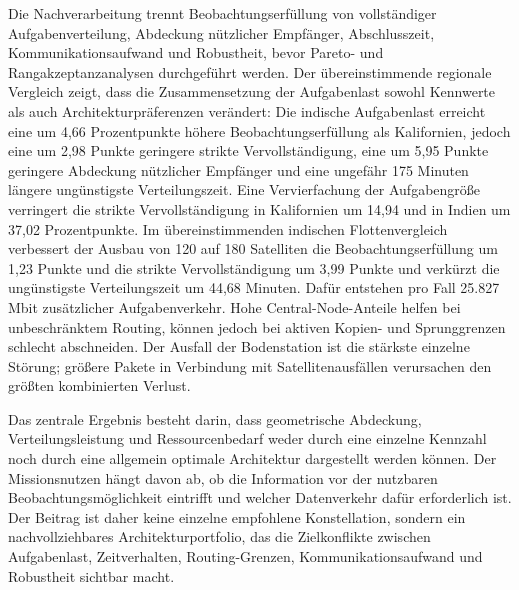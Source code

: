 Die Nachverarbeitung trennt Beobachtungserfüllung von vollständiger Aufgabenverteilung, Abdeckung nützlicher Empfänger, Abschlusszeit, Kommunikationsaufwand und Robustheit, bevor Pareto- und Rangakzeptanzanalysen durchgeführt werden. Der übereinstimmende regionale Vergleich zeigt, dass die Zusammensetzung der Aufgabenlast sowohl Kennwerte als auch Architekturpräferenzen verändert: Die indische Aufgabenlast erreicht eine um 4,66 Prozentpunkte höhere Beobachtungserfüllung als Kalifornien, jedoch eine um 2,98 Punkte geringere strikte Vervollständigung, eine um 5,95 Punkte geringere Abdeckung nützlicher Empfänger und eine ungefähr 175 Minuten längere ungünstigste Verteilungszeit. Eine Vervierfachung der Aufgabengröße verringert die strikte Vervollständigung in Kalifornien um 14,94 und in Indien um 37,02 Prozentpunkte. Im übereinstimmenden indischen Flottenvergleich verbessert der Ausbau von 120 auf 180 Satelliten die Beobachtungserfüllung um 1,23 Punkte und die strikte Vervollständigung um 3,99 Punkte und verkürzt die ungünstigste Verteilungszeit um 44,68 Minuten. Dafür entstehen pro Fall 25.827 Mbit zusätzlicher Aufgabenverkehr. Hohe Central-Node-Anteile helfen bei unbeschränktem Routing, können jedoch bei aktiven Kopien- und Sprunggrenzen schlecht abschneiden. Der Ausfall der Bodenstation ist die stärkste einzelne Störung; größere Pakete in Verbindung mit Satellitenausfällen verursachen den größten kombinierten Verlust.

Das zentrale Ergebnis besteht darin, dass geometrische Abdeckung, Verteilungsleistung und Ressourcenbedarf weder durch eine einzelne Kennzahl noch durch eine allgemein optimale Architektur dargestellt werden können. Der Missionsnutzen hängt davon ab, ob die Information vor der nutzbaren Beobachtungsmöglichkeit eintrifft und welcher Datenverkehr dafür erforderlich ist. Der Beitrag ist daher keine einzelne empfohlene Konstellation, sondern ein nachvollziehbares Architekturportfolio, das die Zielkonflikte zwischen Aufgabenlast, Zeitverhalten, Routing-Grenzen, Kommunikationsaufwand und Robustheit sichtbar macht.
